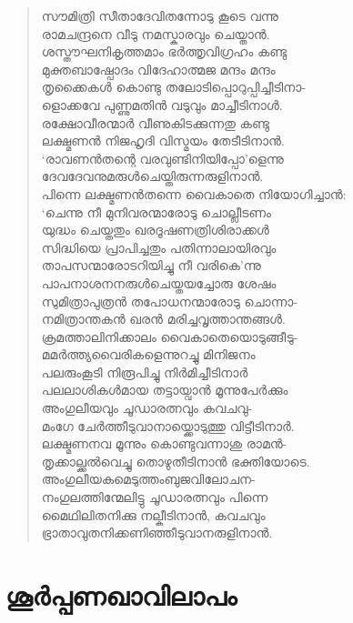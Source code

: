 \begin{verse}
സൗമിത്രി സീതാദേവിതന്നോടു കൂടെ വന്നു\\
രാമചന്ദ്രനെ വീടു നമസ്കാരവും ചെയ്താന്‍.\\
ശസ്തൗഘനികൃത്തമാം ഭര്‍ത്തൃവിഗ്രഹം കണ്ടു\\
മുക്തബാഷ്പോദം വിദേഹാത്മജ മന്ദം മന്ദം\\
തൃക്കൈകള്‍ കൊണ്ടു തലോടിപ്പൊറുപ്പിച്ചീടിനാ-\\
ളൊക്കവേ പുണ്ണുമതിന്‍ വടുവും മാച്ചീടിനാള്‍.\\
രക്ഷോവീരന്മാര്‍ വീണുകിടക്കുന്നതു കണ്ടു\\
ലക്ഷ്മണന്‍ നിജഹൃദി വിസ്മയം തേടീടിനാന്‍.\\
‘രാവണന്‍തന്റെ വരവുണ്ടിനിയിപ്പോ’ളെന്നു\\
ദേവദേവനുമരുള്‍ചെയ്തിരുന്നരുളിനാന്‍.\\
പിന്നെ ലക്ഷ്മണന്‍തന്നെ വൈകാതെ നിയോഗിച്ചാന്‍:\\
‘ചെന്നു നീ മുനിവരന്മാരോടു ചൊല്ലീടണം\\
യുദ്ധം ചെയ്തതും ഖരദൂഷണത്രിശിരാക്കള്‍\\
സിദ്ധിയെ പ്രാപിച്ചതും പതിന്നാലായിരവും\\
താപസന്മാരോടറിയിച്ചു നീ വരികെ’ന്നു\\
പാപനാശനനരുള്‍ചെയ്തയച്ചോരു ശേഷം\\
സുമിത്രാപുത്രന്‍ തപോധനന്മാരോടു ചൊന്നാ-\\
നമിത്രാന്തകന്‍ ഖരന്‍ മരിച്ചവൃത്താന്തങ്ങള്‍.\\
ക്രമത്താലിനിക്കാലം വൈകാതെയൊടുങ്ങീടു-\\
മമര്‍ത്ത്യവൈരികളെന്നുറച്ചു മിനിജനം\\
പലരുംകൂടി നിരൂപിച്ചു നിര്‍മിച്ചീടിനാര്‍\\
പലലാശികള്‍മായ തട്ടായ്വാന്‍ മൂന്നുപേര്‍ക്കും\\
അംഗുലീയവും ചൂഡാരത്നവും കവചവു-\\
മംഗേ ചേര്‍ത്തീടുവാനായ്ക്കൊടുത്തു വിട്ടീടിനാര്‍.\\
ലക്ഷ്മണനവ മൂന്നും കൊണ്ടുവന്നാശു രാമന്‍-\\
തൃക്കാല്ക്കല്‍വെച്ചു തൊഴുതീടിനാന്‍ ഭക്തിയോടെ.\\
അംഗുലീയകമെടുത്തംബുജവിലോചന-\\
നംഗുലത്തിന്മേലിട്ടു ചൂഡാരത്നവും പിന്നെ\\
മൈഥിലിതനിക്കു നല്കീടിനാന്‍, കവചവും\\
ഭ്രാതാവുതനിക്കണിഞ്ഞീടുവാനരുളിനാന്‍.
\end{verse}

\section{ശൂര്‍പ്പണഖാവിലാപം}


